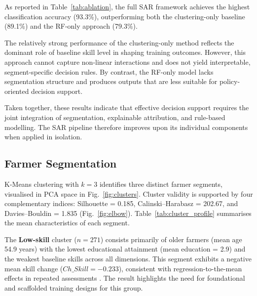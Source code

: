 \documentclass[3p,twocolumn,authoryear]{elsarticle}
\begin{document}
As reported in Table~\ref{tab:ablation}, the full SAR framework achieves
the highest classification accuracy (93.3\%), outperforming both the
clustering-only baseline (89.1\%) and the RF-only approach (79.3\%).

The relatively strong performance of the clustering-only method reflects
the dominant role of baseline skill level in shaping training outcomes.
However, this approach cannot capture non-linear interactions and does
not yield interpretable, segment-specific decision rules.
By contrast, the RF-only model lacks segmentation structure and produces
outputs that are less suitable for policy-oriented decision support.

Taken together, these results indicate that effective decision support
requires the joint integration of segmentation, explainable attribution,
and rule-based modelling.
The SAR pipeline therefore improves upon its individual components when
applied in isolation.

\begin{table}[htbp]
\centering
\caption{Ablation study comparing SAR with simplified baseline approaches}
\label{tab:ablation}
\end{table}

\subsection{Farmer Segmentation}

K-Means clustering with $k = 3$ identifies three distinct farmer segments,
visualised in PCA space in Fig.~\ref{fig:clusters}.
Cluster validity is supported by four complementary indices: Silhouette =
0.185, Calinski--Harabasz = 202.67, and Davies--Bouldin = 1.835
(Fig.~\ref{fig:elbow}).
Table~\ref{tab:cluster_profile} summarises the mean characteristics of
each segment.

The \textbf{Low-skill} cluster ($n = 271$) consists primarily of older
farmers (mean age 54.9 years) with the lowest educational attainment
(mean education = 2.9) and the weakest baseline skills across all
dimensions.
This segment exhibits a negative mean skill change
($Ch\_Skill = -0.233$), consistent with regression-to-the-mean effects in
repeated assessments \citep{davis2012}.
The result highlights the need for foundational and scaffolded training
designs for this group.
\end{document}
